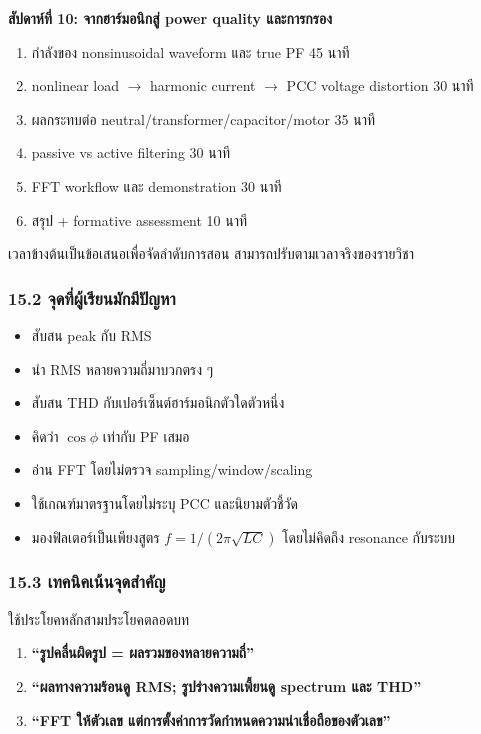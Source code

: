 \textbf{สัปดาห์ที่ 10: จากฮาร์มอนิกสู่ power quality และการกรอง}

\begin{enumerate}
    \item กำลังของ nonsinusoidal waveform และ true PF 45 นาที
    \item nonlinear load $\rightarrow$ harmonic current $\rightarrow$ PCC voltage distortion 30 นาที
    \item ผลกระทบต่อ neutral/transformer/capacitor/motor 35 นาที
    \item passive vs active filtering 30 นาที
    \item FFT workflow และ demonstration 30 นาที
    \item สรุป + formative assessment 10 นาที
\end{enumerate}

เวลาข้างต้นเป็นข้อเสนอเพื่อจัดลำดับการสอน สามารถปรับตามเวลาจริงของรายวิชา

\subsubsection{15.2 จุดที่ผู้เรียนมักมีปัญหา}

\begin{itemize}
    \item สับสน peak กับ RMS
    \item นำ RMS หลายความถี่มาบวกตรง ๆ
    \item สับสน THD กับเปอร์เซ็นต์ฮาร์มอนิกตัวใดตัวหนึ่ง
    \item คิดว่า $\cos\phi$ เท่ากับ PF เสมอ
    \item อ่าน FFT โดยไม่ตรวจ sampling/window/scaling
    \item ใช้เกณฑ์มาตรฐานโดยไม่ระบุ PCC และนิยามตัวชี้วัด
    \item มองฟิลเตอร์เป็นเพียงสูตร $f=1/(2\pi\sqrt{LC})$ โดยไม่คิดถึง resonance กับระบบ
\end{itemize}

\subsubsection{15.3 เทคนิคเน้นจุดสำคัญ}

ใช้ประโยคหลักสามประโยคตลอดบท

\begin{enumerate}
    \item \textbf{“รูปคลื่นผิดรูป = ผลรวมของหลายความถี่”}
    \item \textbf{“ผลทางความร้อนดู RMS; รูปร่างความเพี้ยนดู spectrum และ THD”}
    \item \textbf{“FFT ให้ตัวเลข แต่การตั้งค่าการวัดกำหนดความน่าเชื่อถือของตัวเลข”}
\end{enumerate}

